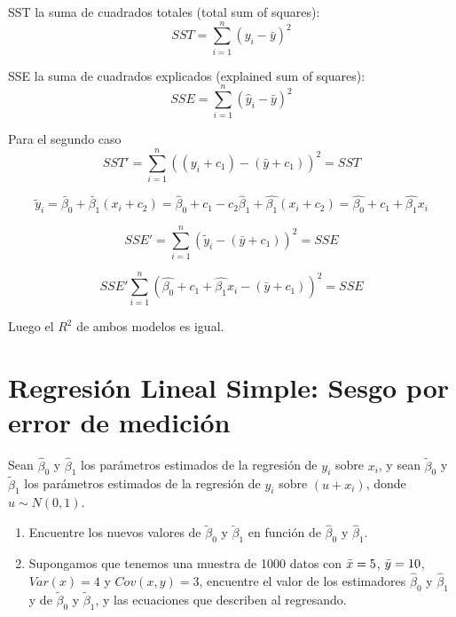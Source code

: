 \documentclass[10pt,a4paper]{article}
\begin{document}
    
{ SST la suma de cuadrados totales (total sum of squares):
		\[ SST = \sum_{i=1}^{n} (y_i - \bar{y})^2 \]
		
	 SSE la suma de cuadrados explicados (explained sum of squares):
	{	\[ SSE = \sum_{i=1}^{n} (\hat{y}_i - \bar{y})^2 \]}	

 Para el segundo caso
		\[ SST' = \sum_{i=1}^{n} ((y_i+c_1) - (\bar{y}+c_1))^2 =SST\]
		
		
$$\tilde{y}_i=\tilde{\beta_0}+\tilde{\beta_1}(x_i+c_2)=\hat{\beta}_0+c_1-c_2\hat{\beta}_1 + \hat{\beta_1}(x_i+c_2)= \hat{\beta_0}+c_1+\hat{\beta_1}x_i$$
	{	\[ SSE' = \sum_{i=1}^{n} (\tilde{y}_i - (\bar{y}+c_1))^2=SSE \]

 $$SSE' \sum_{i=1}^{n} (\hat{\beta_0}+c_1+\hat{\beta_1}x_i - (\bar{y}+c_1))^2=SSE $$
 
 Luego el $R^2$ de ambos modelos es igual. 
 }		
 
 
 }



\section{Regresión Lineal Simple: Sesgo por error de medición}

Sean \( \hat{\beta}_0 \) y \( \hat{\beta}_1 \) los parámetros estimados de la regresión de \( y_i \) sobre \( x_i \), y sean \( \tilde{\beta}_0 \) y \( \tilde{\beta}_1 \) los parámetros estimados de la regresión de \( y_i \) sobre \( (u + x_i) \), donde \( u \sim N(0, 1) \). 
\begin{enumerate}
    \item Encuentre los nuevos valores de \( \tilde{\beta}_0 \) y \( \tilde{\beta}_1 \) en función de \( \hat{\beta}_0 \) y \( \hat{\beta}_1 \).

    \item Supongamos que tenemos una muestra de 1000 datos con $\Bar{x} = 5$, $\Bar{y}=10$, $Var(x) = 4$ y $Cov(x,y)=3$, encuentre el valor de los estimadores \( \hat{\beta}_0 \) y \( \hat{\beta}_1 \) y de \( \tilde{\beta}_0 \) y \( \tilde{\beta}_1 \), y las ecuaciones que describen al regresando.

\end{enumerate}
\end{document}
